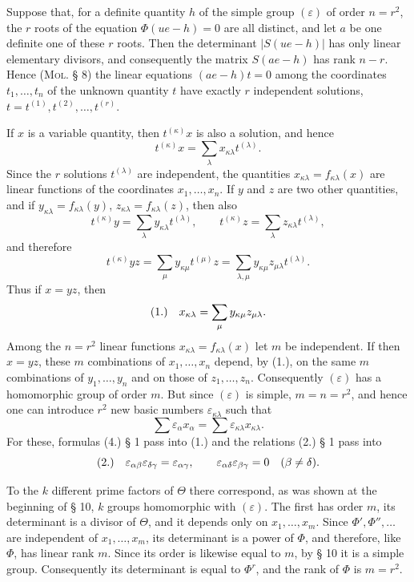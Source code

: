 \documentclass[11pt]{article}
\newcommand{\eps}{\varepsilon}
\newcommand{\fnum}[1]{\textup{(\ensuremath{#1}.)}\quad}
\begin{document}
Suppose that, for a definite quantity $h$ of the simple group $(\eps)$ of order $n=r^2$, the $r$ roots of the equation $\Phi(ue-h)=0$ are all distinct, and let $a$ be one definite one of these $r$ roots. Then the determinant $|S(ue-h)|$ has only linear elementary divisors, and consequently the matrix $S(ae-h)$ has rank $n-r$. Hence (\textsc{Mol}. § 8) the linear equations $(ae-h)t=0$ among the coordinates $t_1,\ldots,t_n$ of the unknown quantity $t$ have exactly $r$ independent solutions, $t=t^{(1)},t^{(2)},\ldots,t^{(r)}$.

If $x$ is a variable quantity, then $t^{(\kappa)}x$ is also a solution, and hence
\[
 t^{(\kappa)}x=\sum_\lambda x_{\kappa\lambda}t^{(\lambda)}.
\]
Since the $r$ solutions $t^{(\lambda)}$ are independent, the quantities $x_{\kappa\lambda}=f_{\kappa\lambda}(x)$ are linear functions of the coordinates $x_1,\ldots,x_n$. If $y$ and $z$ are two other quantities, and if $y_{\kappa\lambda}=f_{\kappa\lambda}(y)$, $z_{\kappa\lambda}=f_{\kappa\lambda}(z)$, then also
\[
 t^{(\kappa)}y=\sum_\lambda y_{\kappa\lambda}t^{(\lambda)},\qquad
 t^{(\kappa)}z=\sum_\lambda z_{\kappa\lambda}t^{(\lambda)},
\]
and therefore
\[
 t^{(\kappa)}yz=\sum_\mu y_{\kappa\mu}t^{(\mu)}z
 =\sum_{\lambda,\mu}y_{\kappa\mu}z_{\mu\lambda}t^{(\lambda)}.
\]
Thus if $x=yz$, then
\[
\fnum{1} x_{\kappa\lambda}=\sum_\mu y_{\kappa\mu}z_{\mu\lambda}.
\]
Among the $n=r^2$ linear functions $x_{\kappa\lambda}=f_{\kappa\lambda}(x)$ let $m$ be independent. If then $x=yz$, these $m$ combinations of $x_1,\ldots,x_n$ depend, by (1.), on the same $m$ combinations of $y_1,\ldots,y_n$ and on those of $z_1,\ldots,z_n$. Consequently $(\eps)$ has a homomorphic group of order $m$. But since $(\eps)$ is simple, $m=n=r^2$, and hence one can introduce $r^2$ new basic numbers $\eps_{\kappa\lambda}$ such that
\[
 \sum \eps_\alpha x_\alpha=\sum \eps_{\kappa\lambda}x_{\kappa\lambda}.
\]
For these, formulas (4.) § 1 pass into (1.) and the relations (2.) § 1 pass into
\[
\fnum{2} \eps_{\alpha\beta}\eps_{\delta\gamma}=\eps_{\alpha\gamma},
\qquad
\eps_{\alpha\delta}\eps_{\beta\gamma}=0\quad(\beta\ne\delta).
\]

To the $k$ different prime factors of $\Theta$ there correspond, as was shown at the beginning of § 10, $k$ groups homomorphic with $(\eps)$. The first has order $m$, its determinant is a divisor of $\Theta$, and it depends only on $x_1,\ldots,x_m$. Since $\Phi',\Phi'',\ldots$ are independent of $x_1,\ldots,x_m$, its determinant is a power of $\Phi$, and therefore, like $\Phi$, has linear rank $m$. Since its order is likewise equal to $m$, by § 10 it is a simple group. Consequently its determinant is equal to $\Phi^r$, and the rank of $\Phi$ is $m=r^2$.
\end{document}
